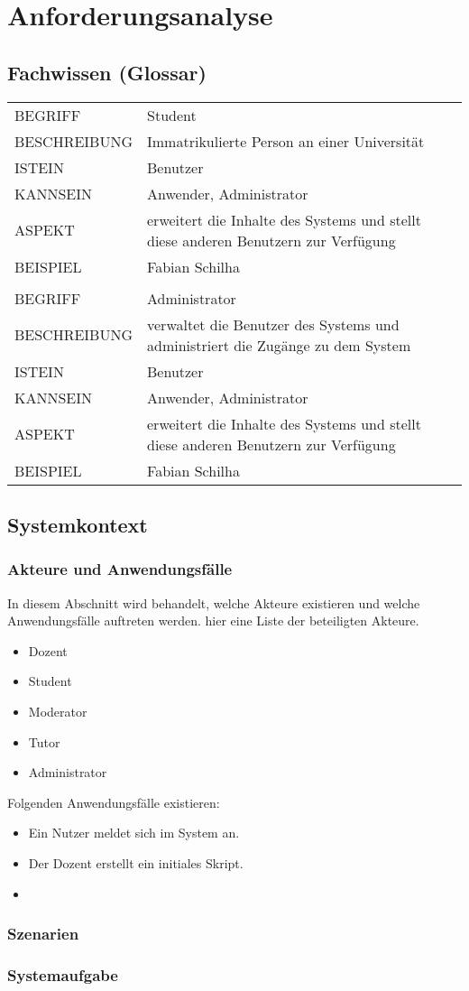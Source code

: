 \documentclass[12pt,a4paper]{article}
\begin{document}
\section{Anforderungsanalyse}
\subsection{Fachwissen (Glossar)}
\begin{tabular}{l l} 
BEGRIFF & Student \\ 
BESCHREIBUNG & Immatrikulierte Person an einer Universität \\ 
ISTEIN & Benutzer \\
KANNSEIN & Anwender, Administrator \\ 
ASPEKT & erweitert die Inhalte des Systems und stellt diese anderen Benutzern zur Verfügung \\
BEISPIEL & Fabian Schilha\\

&\\ 

BEGRIFF & Administrator \\ 
BESCHREIBUNG & verwaltet die Benutzer des Systems und administriert die Zugänge zu dem System \\ 
ISTEIN & Benutzer \\
KANNSEIN & Anwender, Administrator \\ 
ASPEKT & erweitert die Inhalte des Systems und stellt diese anderen Benutzern zur Verfügung \\
BEISPIEL & Fabian Schilha\\
\end{tabular}


\subsection{Systemkontext}
\subsubsection{Akteure und Anwendungsfälle}
In diesem Abschnitt wird behandelt, welche Akteure existieren und welche Anwendungsfälle auftreten werden. 
hier eine Liste der beteiligten Akteure.

\begin{itemize}
\item Dozent
\item Student
\item Moderator
\item Tutor
\item Administrator
\end{itemize}

Folgenden Anwendungsfälle existieren:
\begin{itemize}
\item Ein Nutzer meldet sich im System an.
\item Der Dozent erstellt ein initiales Skript.
\item 
\end{itemize}
\subsubsection{Szenarien}
\subsubsection{Systemaufgabe}
\end{document}
